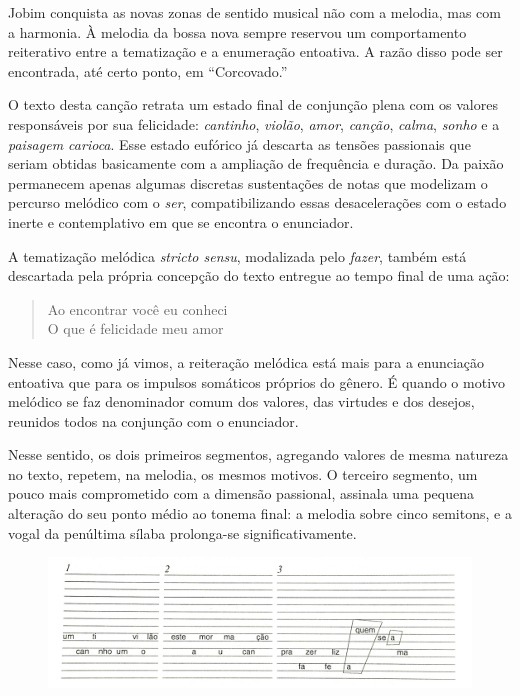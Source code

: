 Jobim conquista as novas zonas de sentido musical não com a melodia, mas
com a harmonia. À melodia da bossa nova sempre reservou um comportamento
reiterativo entre a tematização e a enumeração entoativa. A razão disso
pode ser encontrada, até certo ponto, em ``Corcovado.''

O texto desta canção retrata um estado final de conjunção plena com os
valores responsáveis por sua felicidade: \textit{cantinho}, \textit{violão}, \textit{amor},
\textit{canção}, \textit{calma}, \textit{sonho} e a \textit{paisagem carioca}. Esse estado eufórico já
descarta as tensões passionais que seriam obtidas basicamente com a
ampliação de frequência e duração. Da paixão permanecem apenas algumas
discretas sustentações de notas que modelizam o percurso melódico com o
\textit{ser}, compatibilizando essas desacelerações com o estado inerte e
contemplativo em que se encontra o enunciador.

A tematização melódica \textit{stricto sensu}, modalizada pelo \textit{fazer}, também
está descartada pela própria concepção do texto entregue ao tempo final
de uma ação:

\begin{verse}
\small{Ao encontrar você eu conheci\\
O que é felicidade meu amor}
\end{verse}

Nesse caso, como já vimos, a reiteração melódica está mais para a
enunciação entoativa que para os impulsos somáticos próprios do gênero.
É quando o motivo melódico se faz denominador comum dos valores, das
virtudes e dos desejos, reunidos todos na conjunção com o enunciador.

Nesse sentido, os dois primeiros segmentos, agregando valores de mesma
natureza no texto, repetem, na melodia, os mesmos motivos. O terceiro
segmento, um pouco mais comprometido com a dimensão passional, assinala
uma pequena alteração do seu ponto médio ao tonema final: a melodia
sobre cinco semitons, e a vogal da penúltima sílaba prolonga-se
significativamente.

\begin{figure}[H]
\includegraphics[width=\textwidth]{./imgs/figura10.jpg}
\end{figure}

